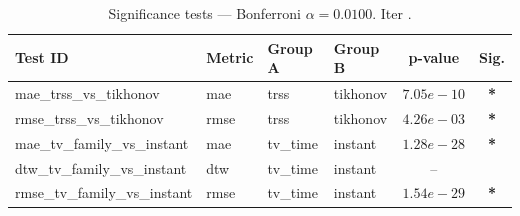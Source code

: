 ﻿%
\begin{table}[ht]
\centering
\caption[EEG reconstruction - Iteration it31]{Significance tests — Bonferroni $\alpha=0.0100$. Iter .}
\label{tab:sig_it31_strong_tv_3syn}
\small
\begin{tabular}{llllcc}
\toprule
Test ID & Metric & Group A & Group B & p-value & Sig. \\
\midrule
mae\_trss\_vs\_tikhonov & mae & trss & tikhonov & $7.05e-10$ & \textbf{*} \\
rmse\_trss\_vs\_tikhonov & rmse & trss & tikhonov & $4.26e-03$ & \textbf{*} \\
mae\_tv\_family\_vs\_instant & mae & tv\_time & instant & $1.28e-28$ & \textbf{*} \\
dtw\_tv\_family\_vs\_instant & dtw & tv\_time & instant & -- &  \\
rmse\_tv\_family\_vs\_instant & rmse & tv\_time & instant & $1.54e-29$ & \textbf{*} \\
\bottomrule
\end{tabular}
\end{table}







